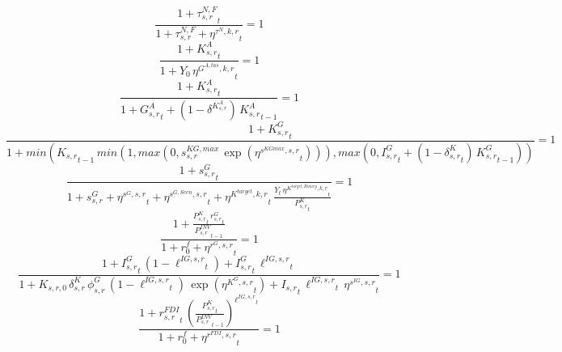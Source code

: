 \begin{dmath}
\frac{1+{{\tau^{N,F}_{s,r}}}_{t}}{1+{{\tau^{N,F}_{s,r}}}+{{\eta^{\tau^{N},k,r}}}_{t}}=1
\end{dmath}
\noindent[name= `sector specific adaptation capital target from government expenditure 5 1']
\begin{dmath}
\frac{1+{{K^{A}_{s,r}}}_{t}}{1+{{Y_0}}\, {{\eta^{G^{A,tas},k,r}}}_{t}}=1
\end{dmath}
\noindent[name= `sector specific adaptation capital against climate change 5 1']
\begin{dmath}
\frac{1+{{K^{A}_{s,r}}}_{t}}{1+{{G^{A}_{s,r}}}_{t}+\left(1-{{\delta^{K^{A}_{s,r}}}}\right)\, {{K^{A}_{s,r}}}_{t-1}}=1
\end{dmath}
\noindent[name= `sector specific public capital 5 1']
\begin{dmath}
\frac{1+{{K^G_{s,r}}}_{t}}{1+min({{K_{s,r}}}_{t-1}\, min(1,max(0,{{s^{KG,max}_{s,r}}}\, \exp\left({{\eta^{s^{KGmax},s,r}}}_{t}\right))),max(0,{{I^G_{s,r}}}_{t}+\left(1-{{\delta^{K}_{s,r}}}_{t}\right)\, {{K^G_{s,r}}}_{t-1}))}=1
\end{dmath}
\noindent[name= `sector specific public investment 5 1']
\begin{dmath}
\frac{1+{{s^G_{s,r}}}_{t}}{1+{{s^{G}_{s,r}}}+{{\eta^{s^G,s,r}}}_{t}+{{\eta^{s^{G,Scen},s,r}}}_{t}+{{\eta^{K^{target},k,r}}}_{t}\, \frac{{Y}_{t}\, {{\eta^{K^{target,Binary},k,r}}}_{t}}{{{P^K_{s,r}}}_{t}}}=1
\end{dmath}
\noindent[name= `sector specific public rental rate 5 1']
\begin{dmath}
\frac{1+\frac{{{P^K_{s,r}}}_{t}\, {{r^G_{s,r}}}_{t}}{{{P^{INV}_{s,r}}}_{t-1}}}{1+{{r^f_0}}+{{\eta^{r^G,s,r}}}_{t}}=1
\end{dmath}
\noindent[name= `scenario sector specific public capital / investment share 5 1']
\begin{dmath}
\frac{1+{{I^G_{s,r}}}_{t}\, \left(1-{{\ell^{IG,s,r}}}_{t}\right)+{{I^G_{s,r}}}_{t}\, {{\ell^{IG,s,r}}}_{t}}{1+{{K_{s,r,0}}}\, {{\delta^{K}_{s,r}}}\, {{\phi^{G}_{s,r}}}\, \left(1-{{\ell^{IG,s,r}}}_{t}\right)\, \exp\left({{\eta^{K^G,s,r}}}_{t}\right)+{{I_{s,r}}}_{t}\, {{\ell^{IG,s,r}}}_{t}\, {{\eta^{s^{IG},s,r}}}_{t}}=1
\end{dmath}
\noindent[name= `FDI rental rate (returns to foreign investors) 5 1']
\begin{dmath}
\frac{1+{{r^{FDI}_{s,r}}}_{t}\, \left(\frac{{{P^K_{s,r}}}_{t}}{{{P^{INV}_{s,r}}}_{t-1}}\right)^{{{\ell^{IG,s,r}}}_{t}}}{1+{{r^f_0}}+{{\eta^{r^{FDI},s,r}}}_{t}}=1
\end{dmath}
